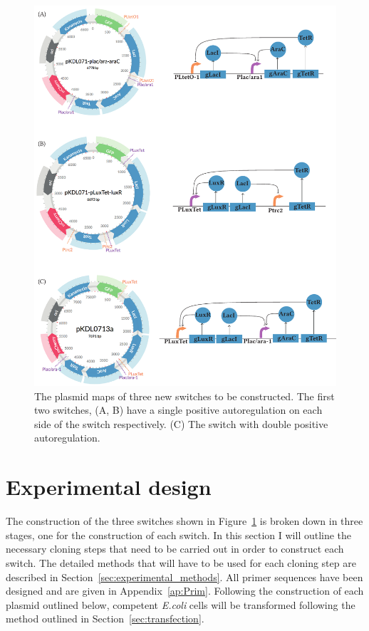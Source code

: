 \begin{figure}[htbp]
	\begin{center}
		\includegraphics[scale=0.7]{../../chapters/chapterDesignSwitches/images/final-plasmids.pdf}
		\caption[The plasmid maps of three new switches to be constructed.]{\label{fig:finalpl}The plasmid maps of three new switches to be constructed. The first two switches, (A, B) have a single positive autoregulation on each side of the switch respectively. (C) The switch with double positive autoregulation.}
	\end{center}
\end{figure}

\section{Experimental design}

The construction of the three switches shown in Figure~\ref{fig:finalpl} is broken down in three stages, one for the construction of each switch. In this section I will outline the necessary cloning steps that need to be carried out in order to construct each switch. The detailed methods that will have to be used for each cloning step are described in Section~\ref{sec:experimental_methods}. All primer sequences have been designed and are given in Appendix~\ref{ap:Prim}. Following the construction of each plasmid outlined below, competent \textit{E.coli} cells will be transformed following the method outlined in Section~\ref{sec:transfection}.

